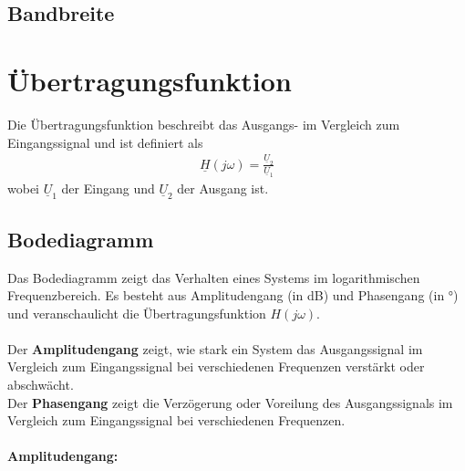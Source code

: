 \subsection{Bandbreite}

\section{Übertragungsfunktion}
Die Übertragungsfunktion beschreibt das Ausgangs- im Vergleich zum
Eingangssignal und ist definiert als
\begin{align}
    \underline{H}(j\omega)=\frac{\underline{U}_2}{\underline{U}_1}
\end{align}
wobei $\underline{U}_1$ der Eingang und $\underline{U}_2$ der Ausgang ist.

\subsection{Bodediagramm}
Das Bodediagramm zeigt das Verhalten eines Systems im logarithmischen
Frequenzbereich. Es besteht aus Amplitudengang (in dB) und Phasengang (in °)
und veranschaulicht die Übertragungsfunktion $H(j\omega)$.\\\\ Der
\textbf{Amplitudengang} zeigt, wie stark ein System das Ausgangssignal im
Vergleich zum Eingangssignal bei verschiedenen Frequenzen verstärkt oder
abschwächt. \\ Der \textbf{Phasengang} zeigt die Verzögerung oder Voreilung des
Ausgangssignals im Vergleich zum Eingangssignal bei verschiedenen Frequenzen.
\\\\ \textbf{Amplitudengang:}
\begin{center}
\end{center}
